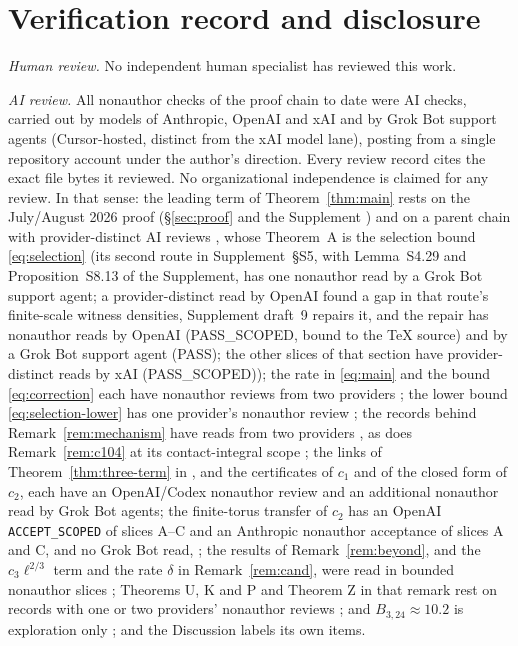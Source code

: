 \section{Verification record and disclosure}\label{sec:disclosure}

\emph{Human review.} No independent human specialist has reviewed this work.

\emph{AI review.} All nonauthor checks of the proof chain to date were AI checks, carried out by models of Anthropic, OpenAI and xAI and by Grok Bot support agents (Cursor-hosted, distinct from the xAI model lane), posting from a single repository account under the author's direction. Every review record cites the exact file bytes it reviewed. No organizational independence is claimed for any review. In that sense: the leading term of Theorem~\ref{thm:main} rests on the July/August 2026 proof (\S\ref{sec:proof} and the Supplement ) and on a parent chain with provider-distinct AI reviews , whose Theorem~A is the selection bound \eqref{eq:selection} (its second route in Supplement~\S S5, with Lemma~S4.29 and Proposition~S8.13 of the Supplement, has one nonauthor read by a Grok Bot support agent; a provider-distinct read by OpenAI found a gap in that route's finite-scale witness densities, Supplement draft~9 repairs it, and the repair has nonauthor reads by OpenAI (PASS\_SCOPED, bound to the \TeX{} source) and by a Grok Bot support agent (PASS); the other slices of that section have provider-distinct reads by xAI (PASS\_SCOPED)); the rate in \eqref{eq:main} and the bound \eqref{eq:correction} each have nonauthor reviews from two providers ; the lower bound \eqref{eq:selection-lower} has one provider's nonauthor review ; the records behind Remark~\ref{rem:mechanism} have reads from two providers , as does Remark~\ref{rem:c104} at its contact-integral scope ; the links of Theorem~\ref{thm:three-term} in , and the certificates of $c_1$ and of the closed form of $c_2$, each have an OpenAI/Codex nonauthor review and an additional nonauthor read by Grok Bot agents; the finite-torus transfer of $c_2$ has an OpenAI \texttt{ACCEPT\_SCOPED} of slices A--C and an Anthropic nonauthor acceptance of slices A and C, and no Grok Bot read, ; the results of Remark~\ref{rem:beyond}, and the $c_3\ell^{2/3}$ term and the rate $\delta$ in Remark~\ref{rem:cand}, were read in bounded nonauthor slices ; Theorems U, K and P and Theorem Z in that remark rest on records with one or two providers' nonauthor reviews ; and $B_{3,24}\approx 10.2$ is exploration only ; and the Discussion labels its own items.

